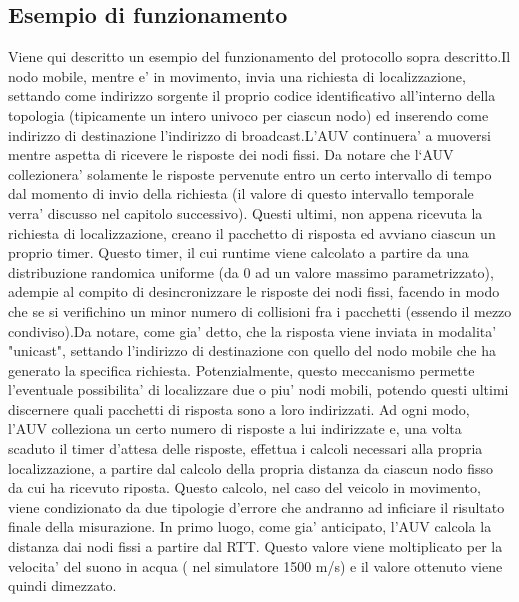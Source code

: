 \subsection{Esempio di funzionamento}
Viene qui descritto un esempio del funzionamento del protocollo sopra descritto.\newline Il nodo mobile, mentre e' in movimento, invia una richiesta di localizzazione, settando come indirizzo sorgente il proprio codice identificativo all'interno della topologia (tipicamente un intero univoco per ciascun nodo)
ed inserendo come indirizzo di destinazione l'indirizzo di broadcast.\newline L'AUV continuera' a muoversi mentre aspetta di ricevere le risposte dei nodi fissi. Da notare che l`AUV collezionera' solamente le risposte pervenute entro un certo intervallo di tempo dal momento di invio della richiesta (il valore di questo intervallo temporale verra' discusso nel capitolo successivo).\newline
Questi ultimi, non appena ricevuta la richiesta di localizzazione, creano il pacchetto di risposta ed avviano ciascun un proprio timer. Questo timer, il cui runtime viene calcolato a partire da una distribuzione randomica uniforme (da 0 ad un valore massimo parametrizzato), adempie al compito di desincronizzare le risposte dei nodi fissi,
facendo in modo che se si verifichino un minor numero di collisioni fra i pacchetti (essendo il mezzo condiviso).\newline Da notare, come gia' detto, che la risposta viene inviata in modalita' "unicast", settando l'indirizzo di destinazione con quello del nodo mobile che ha generato la specifica richiesta. Potenzialmente, questo meccanismo permette l'eventuale possibilita' di localizzare due o piu' nodi mobili, potendo questi ultimi discernere quali pacchetti di risposta sono a loro indirizzati.\newline
Ad ogni modo, l'AUV colleziona un certo numero di risposte a lui indirizzate e, una volta scaduto il timer d'attesa delle risposte, effettua i calcoli necessari alla propria localizzazione, a partire dal calcolo della propria distanza da ciascun nodo fisso da cui ha ricevuto riposta.\newline
Questo calcolo, nel caso del veicolo in movimento, viene condizionato da due tipologie d'errore che andranno ad inficiare il risultato finale della misurazione. 
In primo luogo, come gia' anticipato, l'AUV calcola la distanza dai nodi fissi a partire dal RTT. Questo valore viene moltiplicato per la velocita' del suono in acqua ( nel simulatore 1500 m/s) e il valore ottenuto viene quindi dimezzato.
